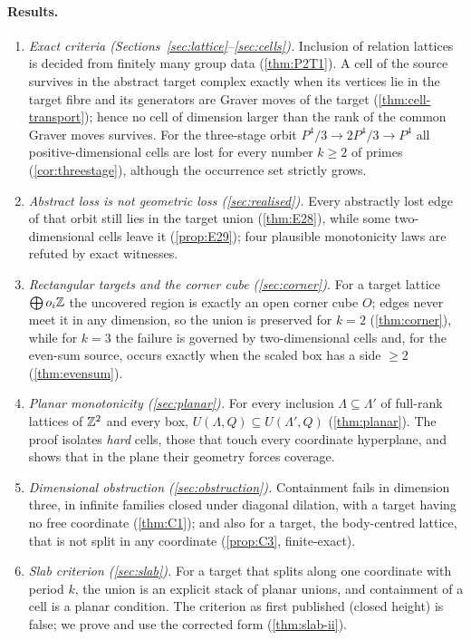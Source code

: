 \paragraph{Results.}
\begin{enumerate}[label=(\Roman*)]
\item \emph{Exact criteria (Sections~\ref{sec:lattice}--\ref{sec:cells}).} Inclusion of relation lattices is decided from finitely many group data (\cref{thm:P2T1}). A cell of the source survives in the abstract target complex exactly when its vertices lie in the target fibre and its generators are Graver moves of the target (\cref{thm:cell-transport}); hence no cell of dimension larger than the rank of the common Graver moves survives. For the three-stage orbit $P^4/3\to2P^4/3\to P^4$ all positive-dimensional cells are lost for every number $k\ge2$ of primes (\cref{cor:threestage}), although the occurrence set strictly grows.
\item \emph{Abstract loss is not geometric loss (\cref{sec:realised}).} Every abstractly lost edge of that orbit still lies in the target union (\cref{thm:E28}), while some two-dimensional cells leave it (\cref{prop:E29}); four plausible monotonicity laws are refuted by exact witnesses.
\item \emph{Rectangular targets and the corner cube (\cref{sec:corner}).} For a target lattice $\bigoplus o_i\mathbb Z$ the uncovered region is exactly an open corner cube $O$; edges never meet it in any dimension, so the union is preserved for $k=2$ (\cref{thm:corner}), while for $k=3$ the failure is governed by two-dimensional cells and, for the even-sum source, occurs exactly when the scaled box has a side $\ge2$ (\cref{thm:evensum}).
\item \emph{Planar monotonicity (\cref{sec:planar}).} For every inclusion $\Lambda\subseteq\Lambda'$ of full-rank lattices of $\mathbb Z^2$ and every box, $U(\Lambda,Q)\subseteq U(\Lambda',Q)$ (\cref{thm:planar}). The proof isolates \emph{hard} cells, those that touch every coordinate hyperplane, and shows that in the plane their geometry forces coverage.
\item \emph{Dimensional obstruction (\cref{sec:obstruction}).} Containment fails in dimension three, in infinite families closed under diagonal dilation, with a target having no free coordinate (\cref{thm:C1}); and also for a target, the body-centred lattice, that is not split in any coordinate (\cref{prop:C3}, finite-exact).
\item \emph{Slab criterion (\cref{sec:slab}).} For a target that splits along one coordinate with period $k$, the union is an explicit stack of planar unions, and containment of a cell is a planar condition. The criterion as first published (closed height) is false; we prove and use the corrected form (\cref{thm:slab-ii}).
\end{enumerate}

